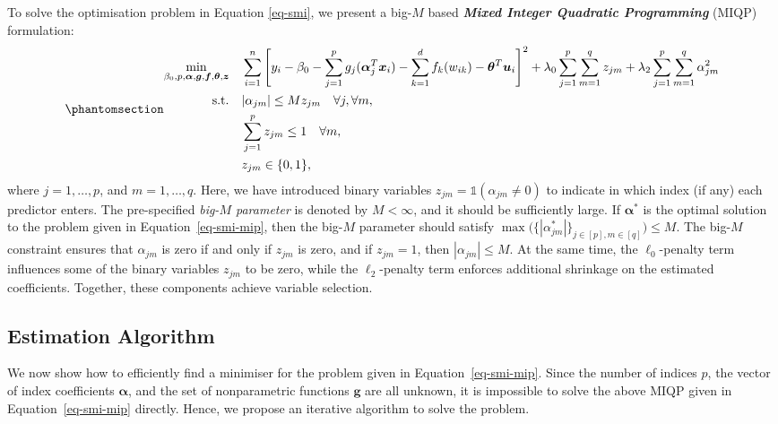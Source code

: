 \documentclass[
  11pt,
  a4paper,
]{article}
\begin{document}
To solve the optimisation problem in Equation \ref{eq-smi}, we present a
big-\(M\) based \textbf{\emph{Mixed Integer Quadratic Programming}}
(MIQP) formulation: \begin{equation}\phantomsection\label{eq-smi-mip}{
\begin{aligned}
  \min_{\beta_{0}, p, \bm{\alpha}, \bm{g}, \bm{f}, \bm{\theta}, \bm{z}} \quad & \sum_{i = 1}^{n}\Bigg [ y_{i} - \beta_{0} - \sum_{j = 1}^{p}{g_{j}(\bm{\alpha}_{j}^{T}\bm{x}_{i})} - \sum_{k = 1}^{d} {f_{k}(w_{ik})} - \bm{\theta}^{T}\bm{u}_{i}\Bigg ]^{2} + \lambda_{0}\sum_{j = 1}^{p}\sum_{m = 1}^{q}z_{jm} + \lambda_{2}\sum_{j = 1}^{p}\sum_{m = 1}^{q} \alpha_{jm}^{2} \\
  \text{s.t.} \quad & |\alpha_{jm}| \le Mz_{jm} \quad \forall j, \forall m, \\
  & \sum_{j = 1}^{p}z_{jm} \le 1 \quad \forall m, \\
  & z_{jm} \in \{0, 1\},
\end{aligned}
}\end{equation} where \(j = 1, \dots, p\), and \(m = 1, \dots, q\).
Here, we have introduced binary variables
\(z_{jm} = \mathbb{1}(\alpha_{jm} \neq 0)\) to indicate in which index
(if any) each predictor enters. The pre-specified \emph{big-\(M\)
parameter} is denoted by \(M < \infty\), and it should be sufficiently
large. If \(\bm{\alpha^{*}}\) is the optimal solution to the problem
given in Equation~\ref{eq-smi-mip}, then the big-\(M\) parameter should
satisfy
\(\max \big ( \{|\alpha_{jm}^{*} |\}_{j\in[p],m\in[q]} \big) \le M\).
The big-\(M\) constraint ensures that \(\alpha_{jm}\) is zero if and
only if \(z_{jm}\) is zero, and if \(z_{jm} = 1\), then
\(|\alpha_{jm}| \le M\). At the same time, the \(\ell_{0}\)-penalty term
influences some of the binary variables \(z_{jm}\) to be zero, while the
\(\ell_{2}\)-penalty term enforces additional shrinkage on the estimated
coefficients. Together, these components achieve variable selection.

\subsection{Estimation Algorithm}\label{estimation-algorithm}

We now show how to efficiently find a minimiser for the problem given in
Equation~\ref{eq-smi-mip}. Since the number of indices \(p\), the vector
of index coefficients \(\bm{\alpha}\), and the set of nonparametric
functions \(\bm{g}\) are all unknown, it is impossible to solve the
above MIQP given in Equation~\ref{eq-smi-mip} directly. Hence, we
propose an iterative algorithm to solve the problem.
\end{document}
